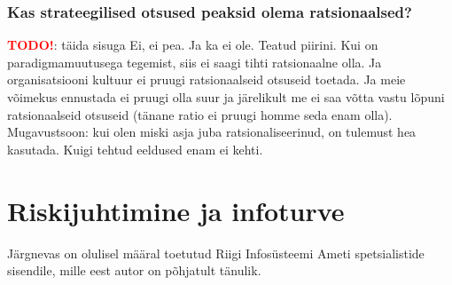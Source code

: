 \documentclass{tufte-book}
\newcommand{\TODO}{\textcolor{red}{\bf TODO!}\xspace}
\begin{document}
\subsection{Kas strateegilised otsused peaksid olema ratsionaalsed?}
\TODO: täida sisuga
Ei, ei pea. Ja ka ei ole. Teatud piirini. Kui on paradigmamuutusega tegemist, siis ei saagi tihti ratsionaalne olla. Ja organisatsiooni kultuur ei pruugi ratsionaalseid otsuseid toetada. Ja meie võimekus ennustada ei pruugi olla suur ja järelikult me ei saa võtta vastu lõpuni ratsionaalseid otsuseid (tänane ratio ei pruugi homme seda enam olla). Mugavustsoon: kui olen miski asja juba ratsionaliseerinud, on tulemust hea kasutada. Kuigi tehtud eeldused enam ei kehti.

\chapter{Riskijuhtimine ja infoturve}
Järgnevas on olulisel määral toetutud Riigi Infosüsteemi Ameti spetsialistide sisendile, mille eest autor on põhjatult tänulik.
\end{document}

